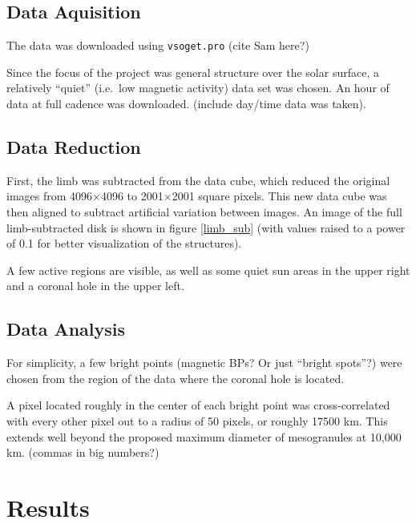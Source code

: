 \documentclass[preprint]{aastex}
\begin{document}
\subsection{Data Aquisition}
The data was downloaded using \texttt{vsoget.pro} (cite Sam here?)

Since the focus of the project was general structure
over the solar surface, a relatively ``quiet''
(i.e.\ low magnetic activity)
data set was chosen.
An hour of data at full cadence was downloaded.
(include day/time data was taken).

\subsection{Data Reduction}
First, the limb was subtracted from the data cube,
which reduced the original images from
4096$\times$4096 to 2001$\times$2001 square pixels.
This new data cube was then aligned to subtract artificial variation
between images. An image of the full limb-subtracted disk is shown in
figure \ref{limb_sub} (with values raised to a power of 0.1 for better
visualization of the structures).


A few active regions are visible, as well as
some quiet sun areas in the upper right and a coronal hole in the
upper left.

\subsection{Data Analysis}
For simplicity, a few bright points (magnetic BPs? Or just ``bright
spots''?) were chosen from the region of the data where the
coronal hole is located.

A pixel located roughly in the center of each bright point
was cross-correlated with
every other pixel out to a radius of 50 pixels, or roughly 17500 km.
This extends well beyond the proposed maximum diameter of mesogranules
at 10,000 km. (commas in big numbers?)

\section{Results}
\end{document}
